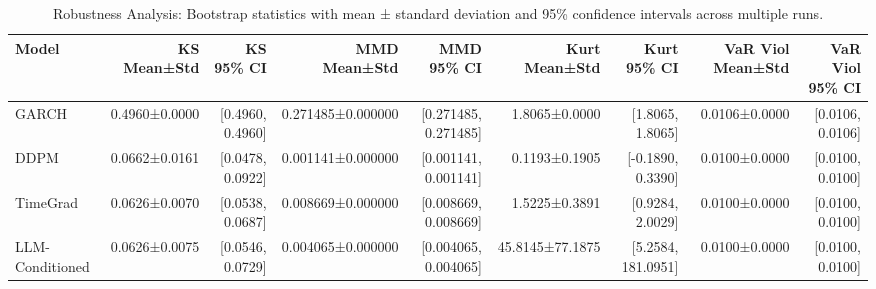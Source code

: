 \begin{table}[htbp]
\centering
\begin{tabular}{lrrrrrrrr}
\toprule
Model & KS Mean±Std & KS 95\% CI & MMD Mean±Std & MMD 95\% CI & Kurt Mean±Std & Kurt 95\% CI & VaR Viol Mean±Std & VaR Viol 95\% CI \\
\midrule
GARCH & 0.4960±0.0000 & [0.4960, 0.4960] & 0.271485±0.000000 & [0.271485, 0.271485] & 1.8065±0.0000 & [1.8065, 1.8065] & 0.0106±0.0000 & [0.0106, 0.0106] \\
DDPM & 0.0662±0.0161 & [0.0478, 0.0922] & 0.001141±0.000000 & [0.001141, 0.001141] & 0.1193±0.1905 & [-0.1890, 0.3390] & 0.0100±0.0000 & [0.0100, 0.0100] \\
TimeGrad & 0.0626±0.0070 & [0.0538, 0.0687] & 0.008669±0.000000 & [0.008669, 0.008669] & 1.5225±0.3891 & [0.9284, 2.0029] & 0.0100±0.0000 & [0.0100, 0.0100] \\
LLM-Conditioned & 0.0626±0.0075 & [0.0546, 0.0729] & 0.004065±0.000000 & [0.004065, 0.004065] & 45.8145±77.1875 & [5.2584, 181.0951] & 0.0100±0.0000 & [0.0100, 0.0100] \\
\bottomrule
\end{tabular}
\caption{Robustness Analysis: Bootstrap statistics with mean ± standard deviation and 95\% confidence intervals across multiple runs.}
\label{tab:robustness_bootstrap}
\end{table}